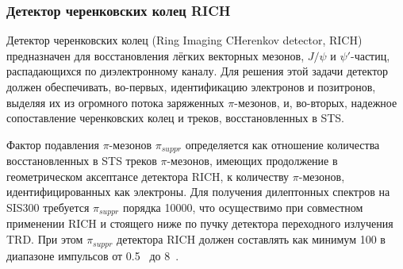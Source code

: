 
\subsubsection{Детектор черенковских колец RICH}\label{sec:secRICH}

Детектор черенковских колец (Ring Imaging CHerenkov detector, RICH) предназначен для восстановления лёгких векторных мезонов, $J/\psi$ и $\psi'$-частиц, распадающихся по диэлектронному каналу. Для решения этой задачи детектор должен обеспечивать, во-первых, идентификацию электронов и позитронов, выделяя их из огромного потока заряженных $\pi$-мезонов, и, во-вторых, надежное сопоставление черенковских колец и треков, восстановленных в STS.

Фактор подавления $\pi$-мезонов $\pi_{suppr}$ определяется как отношение количества восстановленных в STS треков $\pi$-мезонов, имеющих продолжение в геометрическом аксептансе детектора RICH, к количеству $\pi$-мезонов, идентифицированных как электроны. Для получения дилептонных спектров на SIS300 требуется $\pi_{suppr}$ порядка 10000, что осуществимо при совместном применении RICH и стоящего ниже по пучку детектора переходного излучения TRD. При этом $\pi_{suppr}$ детектора RICH должен составлять как минимум 100 в диапазоне импульсов от 0.5~\GeVoverC{} до 8~\GeVoverC{}.


